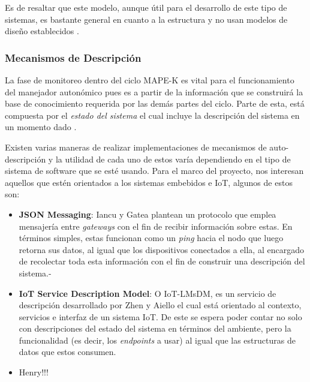 \documentclass[12pt]{article}
\begin{document}
    Es de resaltar que este modelo, aunque útil para el desarrollo de este tipo de sistemas, es bastante general en cuanto a la estructura y no usan modelos de diseño establecidos \cite{Ouareth_2018}. 

    \subsubsection*{Mecanismos de Descripción}


    La fase de monitoreo dentro del ciclo MAPE-K es vital para el funcionamiento del manejador autonómico pues es a partir de la información que se construirá la base de conocimiento requerida por las demás partes del ciclo. Parte de esta, está compuesta por el \textit{estado del sistema} el cual incluye la descripción del sistema en un momento dado \cite{Weiss_2011}.

    Existen varias maneras de realizar implementaciones de mecanismos de auto-descripción y la utilidad de cada uno de estos varía dependiendo en el tipo de sistema de software que se esté usando. Para el marco del proyecto, nos interesan aquellos que estén orientados a los sistemas embebidos e  IoT, algunos de estos son:
    
    \begin{itemize}
        \item \textbf{JSON Messaging}: Iancu y Gatea \citeyear{Iancu_2022} plantean un protocolo que emplea mensajería entre \textit{gateways} con el fin de recibir información sobre estas. En términos simples, estas funcionan como un \textit{ping} hacia el nodo que luego retorna sus datos, al igual que los dispositivos conectados a ella, al encargado de recolectar toda esta información con el fin de construir una descripción del sistema.-
        
        \item \textbf{IoT Service Description Model}: O IoT-LMsDM, es un servicio de descripción desarrollado por Zhen y Aiello \citeyear{Wang_2021} el cual está orientado al contexto, servicios e interfaz de un sistema IoT. De este se espera poder contar no solo con descripciones del estado del sistema en términos del ambiente, pero la funcionalidad (es decir, los \textit{endpoints} a usar) al igual que las estructuras de datos que estos consumen.
        
        \item Henry!!!
    \end{itemize}
\end{document}

